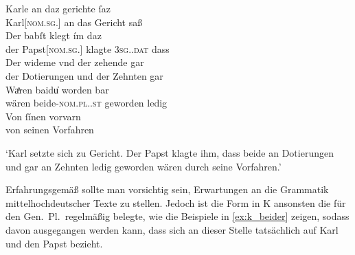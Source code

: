 \begin{exe}
\ex\label{ex:babstimbaideu}
	\gll Karle an daz gerichte ſaz \\
		Karl[\textsc{nom.sg.\MascM}] an das Gericht saß \\
\sn \gll Der babſt klegt ím daz \\
		der Papst[\textsc{nom.sg.\MascM}] klagte \textsc{3sg.\MascM.dat} dass \\
\sn \gll Der wideme vnd der zehende gar \\
		der Dotierungen und der Zehnten gar \\
\sn \gll Waͤren baidu̍ worden bar \\
		wären beide-\textsc{nom.pl.\NeutM.st} geworden ledig \\
\sn \gll Von ſínen vorvarn \\
		von seinen Vorfahren \\
	\begin{taggedline}{\parencites%
	[\pno~85vb,22--24]{kc:K}[vgl. abweichend][14383--14385]{schroeder1895}}
	\trans `Karl setzte sich zu Gericht. Der Papst klagte ihm, dass
		 beide an Dotierungen und gar an Zehnten ledig geworden
		wären durch seine Vorfahren.'
	\end{taggedline}
\end{exe}

Erfahrungsgemäß sollte man vorsichtig sein, Erwartungen an die Grammatik
mittelhochdeutscher Texte zu stellen. Jedoch ist die Form  in
K ansonsten die für den Gen.\ Pl.\ regelmäßig belegte, wie die
Beispiele in \cref{ex:k_beider} zeigen, sodass davon ausgegangen werden kann,
dass sich  an dieser Stelle tatsächlich auf Karl und den Papst
bezieht.

